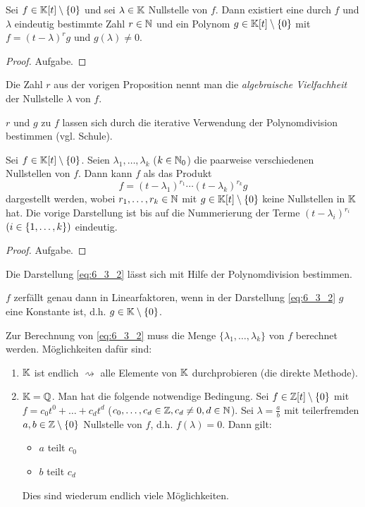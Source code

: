 \begin{propn}
	Sei $ f \in \mathbb K[t] \setminus \{ 0 \} $ und sei $ \lambda \in \mathbb K $ Nullstelle von $ f $. Dann existiert eine durch $ f $ und $ \lambda $ eindeutig bestimmte Zahl $ r \in \mathbb N $ und ein Polynom $ g \in \mathbb K[t] \setminus \{ 0 \} $ mit $ f = (t - \lambda)^r g $ und $ g(\lambda) \neq 0 $.
\end{propn}
\begin{proof}
	Aufgabe.
\end{proof}
\noindent Die Zahl $ r $ aus der vorigen Proposition nennt man die \emph{algebraische Vielfachheit} der Nullstelle $ \lambda $ von $ f $.
\begin{bem}
	$ r $ und $ g $ zu $ f $ lassen sich durch die iterative Verwendung der Polynomdivision bestimmen (vgl. Schule).
\end{bem}
\begin{propn}
	Sei $ f \in \mathbb K[t] \setminus \{ 0 \} $. Seien $ \lambda_1, \ldots, \lambda_k $ ($ k \in \mathbb N_0 $) die paarweise verschiedenen Nullstellen von $ f $. Dann kann $ f $ als das Produkt
	\begin{equation}
		f = (t - \lambda_1)^{r_1} \cdots (t - \lambda_k)^{r_k} g
		\label{eq:6_3_2}
	\end{equation}
	dargestellt werden, wobei $ r_1, \ldots, r_k \in \mathbb N $ mit $ g \in \mathbb K[t] \setminus \{ 0 \} $ keine Nullstellen in $ \mathbb K $ hat. Die vorige Darstellung ist bis auf die Nummerierung der Terme $ (t - \lambda_i)^{r_i} $ $ (i \in \{ 1,\ldots,k \}) $ eindeutig.
\end{propn}
\begin{proof}
	Aufgabe.
\end{proof}
\begin{bem}
	Die Darstellung \eqref{eq:6_3_2} lässt sich mit Hilfe der Polynomdivision bestimmen.
\end{bem}
\begin{bem}
	$ f $ zerfällt genau dann in Linearfaktoren, wenn in der Darstellung \eqref{eq:6_3_2} $ g $ eine Konstante ist, d.h. $ g \in \mathbb K \setminus \{ 0 \} $.
\end{bem}
\begin{bem}
	Zur Berechnung von \eqref{eq:6_3_2} muss die Menge $ \{ \lambda_1, \ldots, \lambda_k \} $ von $ f $ berechnet werden. Möglichkeiten dafür sind:
	\begin{enumerate}
		\item
			$ \mathbb K $ ist endlich $ \rightsquigarrow $ alle Elemente von $ \mathbb K $ durchprobieren (die direkte Methode).
		\item
			$ \mathbb K = \mathbb Q $. Man hat die folgende notwendige Bedingung. Sei $ f \in \mathbb Z[t] \setminus \{ 0 \} $ mit $ f = c_0 t^0 + \ldots + c_d t^d $ ($ c_0, \ldots, c_d \in \mathbb Z, c_d \neq 0, d \in \mathbb N $). Sei $ \lambda = \frac{a}{b} $ mit teilerfremden $ a,b \in \mathbb Z \setminus \{ 0 \} $ Nullstelle von $ f $, d.h. $ f(\lambda) = 0 $. Dann gilt:
			\begin{itemize}
				\item $ a $ teilt $ c_0 $
				\item $ b $ teilt $ c_d $
			\end{itemize}
			Dies sind wiederum endlich viele Möglichkeiten.
	\end{enumerate}
\end{bem}

